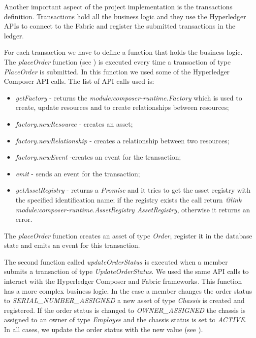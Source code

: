 Another important aspect of the project implementation is the transactions definition. Transactions hold all the business logic and they use the Hyperledger APIs to connect to the Fabric and register the submitted transactions in the ledger.

For each transaction we have to define a function that holds the business logic.
The \emph{placeOrder} function (see ) is executed every time a transaction of type \emph{PlaceOrder} is submitted. In this function we used some of the Hyperledger Composer API calls.
The list of API calls used is:
\begin{itemize}
	\item \emph{getFactory} - returns the \emph{module:composer-runtime.Factory} which is used to create, update resources and to create relationships between resources;
	\item \emph{factory.newResource} - creates an asset;
	\item \emph{factory.newRelationship} - creates a relationship between two resources;
	\item \emph{factory.newEvent} -creates an event for the transaction;
	\item \emph{emit} - sends an event for the transaction;
	\item \emph{getAssetRegistry} - returns a \emph{Promise} and it tries to get the asset registry with the specified identification name; if the registry exists the call return \emph{@link module:composer-runtime.AssetRegistry AssetRegistry}, otherwise it returns an error.
\end{itemize}
The \emph{placeOrder} function creates an asset of type \emph{Order}, register it in the database state and emits an event for this transaction.

The second function called \emph{updateOrderStatus} is executed when a member submits a transaction of type \emph{UpdateOrderStatus}. We used the same API calls to interact with the Hyperledger Composer and Fabric frameworks. This function has a more complex business logic. In the case a member changes the order status to \emph{SERIAL_NUMBER_ASSIGNED} a new asset of type \emph{Chassis} is created and registered. If the order status is changed to \emph{OWNER_ASSIGNED} the chassis is assigned to an owner of type \emph{Employee} and the chassis status is set to \emph{ACTIVE}. In all cases, we update the order status with the new value (see ).












